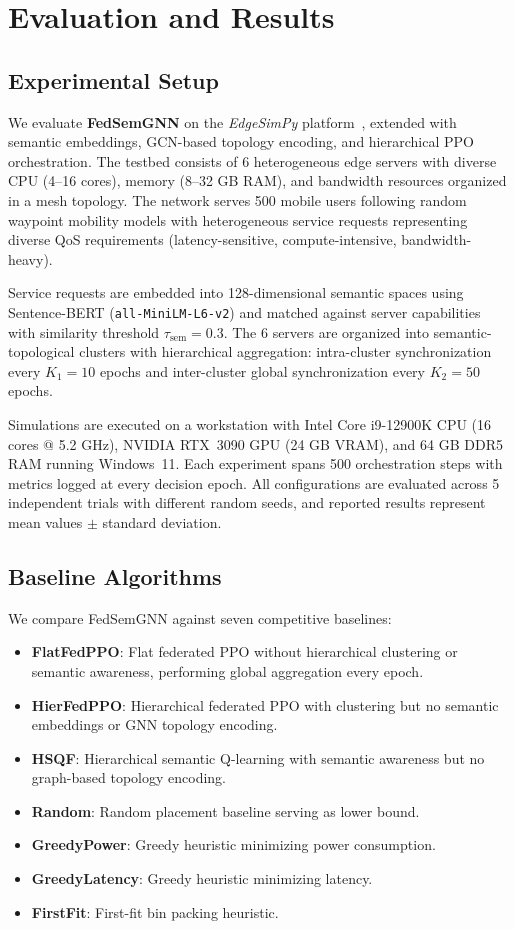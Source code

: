 \section{Evaluation and Results}
\label{sec:evaluation}

\subsection{Experimental Setup}
We evaluate \textbf{FedSemGNN} on the \emph{EdgeSimPy} platform~\cite{edgesimpy}, extended with semantic embeddings, GCN-based topology encoding, and hierarchical PPO orchestration. The testbed consists of 6 heterogeneous edge servers with diverse CPU (4--16 cores), memory (8--32 GB RAM), and bandwidth resources organized in a mesh topology. The network serves 500 mobile users following random waypoint mobility models with heterogeneous service requests representing diverse QoS requirements (latency-sensitive, compute-intensive, bandwidth-heavy).

Service requests are embedded into 128-dimensional semantic spaces using Sentence-BERT (\texttt{all-MiniLM-L6-v2}) and matched against server capabilities with similarity threshold $\tau_{\text{sem}} = 0.3$. The 6 servers are organized into semantic-topological clusters with hierarchical aggregation: intra-cluster synchronization every $K_1 = 10$ epochs and inter-cluster global synchronization every $K_2 = 50$ epochs.

Simulations are executed on a workstation with Intel Core i9-12900K CPU (16 cores @ 5.2 GHz), NVIDIA RTX~3090 GPU (24 GB VRAM), and 64 GB DDR5 RAM running Windows~11. Each experiment spans 500 orchestration steps with metrics logged at every decision epoch. All configurations are evaluated across 5 independent trials with different random seeds, and reported results represent mean values $\pm$ standard deviation.

\subsection{Baseline Algorithms}
We compare FedSemGNN against seven competitive baselines:

\begin{itemize}
	\item \textbf{FlatFedPPO}: Flat federated PPO without hierarchical clustering or semantic awareness, performing global aggregation every epoch.
	\item \textbf{HierFedPPO}: Hierarchical federated PPO with clustering but no semantic embeddings or GNN topology encoding.
	\item \textbf{HSQF}: Hierarchical semantic Q-learning with semantic awareness but no graph-based topology encoding.
	\item \textbf{Random}: Random placement baseline serving as lower bound.
	\item \textbf{GreedyPower}: Greedy heuristic minimizing power consumption.
	\item \textbf{GreedyLatency}: Greedy heuristic minimizing latency.
	\item \textbf{FirstFit}: First-fit bin packing heuristic.
\end{itemize}

